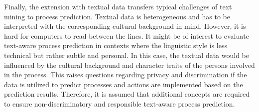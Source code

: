 Finally, the extension with textual data transfers typical challenges of text mining to process prediction.
Textual data is heterogeneous and has to be interpreted with the corresponding cultural background in mind.
However, it is hard for computers to read between the lines.
It might be of interest to evaluate text-aware process prediction in contexts where the linguistic style is less technical but rather subtle and personal.
In this case, the textual data would be influenced by the cultural background and character traits of the persons involved in the process.
This raises questions regarding privacy and discrimination if the data is utilized to predict processes and actions are implemented based on the prediction results.
Therefore, it is assumed that additional concepts are required to ensure non-discriminatory and responsible text-aware process prediction.